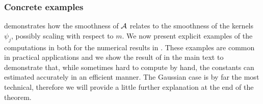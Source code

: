 \documentclass[10pt,a4paper,onecolumn]{article} \usepackage[latin1]{inputenc}
\numberwithin{equation}{section}
\begin{document}
\subsubsection{Concrete examples}
 demonstrates how the smoothness of $\mathcal{A}$ relates to the smoothness of the kernels $\psi_j$, possibly scaling with respect to $m$. We now present explicit examples of the computations in both  for the numerical results in . These examples are common in practical applications and we show the result of  in the main text to demonstrate that, while sometimes hard to compute by hand, the constants can estimated accurately in an efficient manner. The Gaussian case is by far the most technical, therefore we will provide a little further explanation at the end of the theorem.
\end{document}
